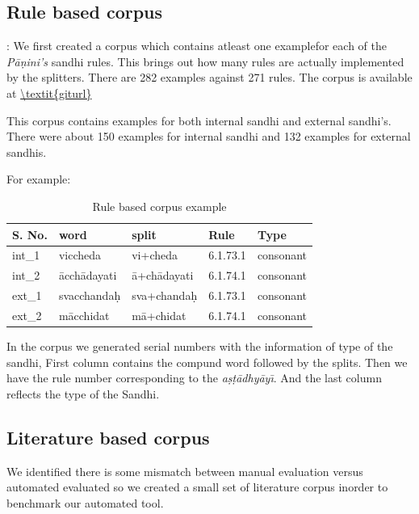 \documentclass[11pt]{article}
\begin{document}
\subsection{Rule based corpus}:
We first created a corpus which contains atleast one examplefor each of the \textit{P\={a}\d{n}ini's} sandhi rules. This brings out how many rules are actually implemented by the splitters. There are 282 examples against 271 rules. The corpus is available at  \url{\textit{giturl}}

This corpus contains examples for both internal sandhi and external sandhi's. There were about 150 examples for internal sandhi and 132 examples for external sandhis.

For example:

\begin{table}[h]
	\begin{center}
		\begin{tabular}{|p{0.8cm}|p{1.6cm}|p{1.5cm}|p{1.1cm}|p{1.3cm}|}
			\hline 
			\bf S. No.	& \bf word	& \bf split	& \bf Rule	& \bf Type \\
			\hline
			int\_1 &	viccheda &	vi+cheda &	6.1.73.1 &	consonant \\
			int\_2 &	\={a}cch\={a}dayati	& \={a}+ch\={a}dayati	& 6.1.74.1	&	consonant \\
			ext\_1 &	svacchanda\d{h}	& sva+chanda\d{h}	& 6.1.73.1 &	consonant \\
			ext\_2 &	m\={a}cchidat &	m\={a}+chidat &	6.1.74.1 &	consonant\\

	\hline
	\end{tabular}
  \end{center}
\caption{\label{font-table} Rule based corpus example }
\end{table}

In the corpus we generated serial numbers with the information of type of the sandhi, First column contains the compund word followed by the splits. Then we have the rule number corresponding to the  \textit{a\d{s}\d{t}\={a}dhy\={a}y\={\i}}. And the last column reflects the type of the Sandhi.
	
\subsection{Literature based corpus}
We identified there is some mismatch between manual evaluation versus automated evaluated so we created a small set of literature corpus inorder to benchmark our automated tool.
\end{document}
